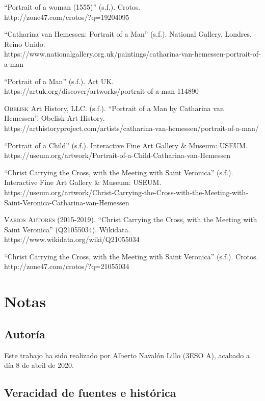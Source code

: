 \documentclass[12pt]{report}
\begin{document}
``Portrait of a woman (1555)'' (s.f.). Crotos.\\
http://zone47.com/crotos/?q=19204095\bigskip

``Catharina van Hemessen: Portrait of a Man'' (s.f.). National Gallery, Londres, Reino Unido.\\
https://www.nationalgallery.org.uk/paintings/catharina-van-hemessen-portrait-of-a-man\bigskip

``Portrait of a Man'' (s.f.). Art UK.\\
https://artuk.org/discover/artworks/portrait-of-a-man-114890\bigskip

\textsc{Obelisk} Art History, LLC. (s.f.). ``Portrait of a Man by Catharina van Hemessen''. Obelisk Art History.\\
https://arthistoryproject.com/artists/catharina-van-hemessen/portrait-of-a-man/\bigskip

``Portrait of a Child'' (s.f.). Interactive Fine Art Gallery \& Museum: USEUM.\\
https://useum.org/artwork/Portrait-of-a-Child-Catharina-van-Hemessen\bigskip

``Christ Carrying the Cross, with the Meeting with Saint Veronica'' (s.f.). Interactive Fine Art Gallery \& Museum: USEUM.\\
https://useum.org/artwork/Christ-Carrying-the-Cross-with-the-Meeting-with-Saint-Veronica-Catharina-van-Hemessen\bigskip

\textsc{Varios Autores} (2015-2019). ``Christ Carrying the Cross, with the Meeting with Saint Veronica'' (Q21055034). Wikidata.\\
https://www.wikidata.org/wiki/Q21055034\bigskip

``Christ Carrying the Cross, with the Meeting with Saint Veronica'' (s.f.). Crotos.\\
http://zone47.com/crotos/?q=21055034

\chapter{Notas}

\section{Autoría}

Este trabajo ha sido realizado por Alberto Navalón Lillo (3ESO A), acabado a día 8 de abril de 2020.

\section{Veracidad de fuentes e histórica}
\end{document}
